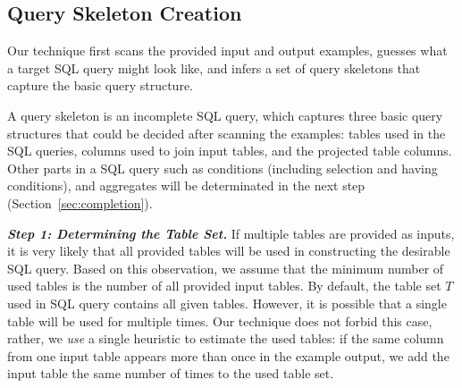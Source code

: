 \subsection{Query Skeleton Creation}
\label{sec:skeleton}

Our technique first scans the provided input and output examples, guesses
what a target SQL query might look like, and infers a set of query skeletons
that capture the basic query structure.

A query skeleton is an incomplete SQL query, which
captures three basic query structures that could
be decided after scanning the examples: tables used in the SQL
queries, columns used to join input tables, and the projected
table columns. Other parts in a SQL query such as conditions
(including selection and having conditions), and aggregates
will be determinated in the next step (Section~\ref{sec:completion}).




\vspace{1mm}
\noindent \textit{\textbf{Step 1: Determining the Table Set.}} If multiple tables are provided as inputs,
it is very likely that all provided tables will be used in constructing the desirable SQL query.
Based on this observation, we assume that
the minimum number of used tables is the number of all provided input tables. By default, the
table set $T$ used in SQL query contains all given tables. However, it is
possible that a single table will be used for multiple times.%
Our technique does not forbid this case, rather, we \textit{use} a single heuristic
to estimate the used tables: if the same column from one input table appears more than once in the
example output, we add the input table the same number of times to the used table set.



